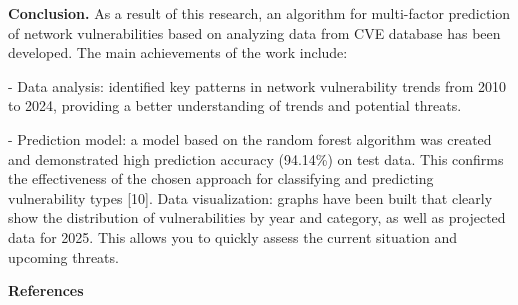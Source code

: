 \begin{multicols}{2}
{\bfseries Conclusion.} As a result of this research, an algorithm for
multi-factor prediction of network vulnerabilities based on analyzing
data from CVE database has been developed. The main achievements of the
work include:

- Data analysis: identified key patterns in network vulnerability trends
from 2010 to 2024, providing a better understanding of trends and
potential threats.

- Prediction model: a model based on the random forest algorithm was
created and demonstrated high prediction accuracy (94.14\%) on test
data. This confirms the effectiveness of the chosen approach for
classifying and predicting vulnerability types {[}10{]}.
Data visualization: graphs have been built that clearly show the
distribution of vulnerabilities by year and category, as well as
projected data for 2025. This allows you to quickly assess the current
situation and upcoming threats.
\end{multicols}

\begin{center}
{\bfseries References}
\end{center}

